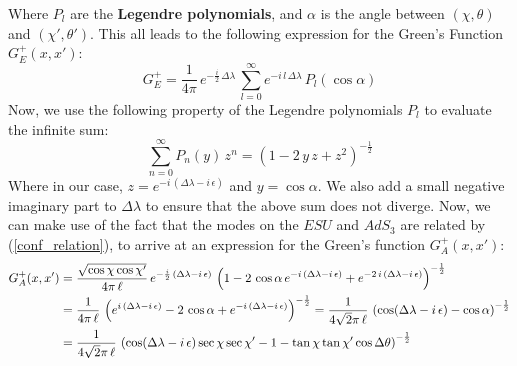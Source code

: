 %
%
%
%
%
%
Where $P_l$ are the \textbf{Legendre polynomials}, and $\alpha$ is the angle between $(\chi, \theta)$ and $(\chi', \theta')$. This all leads to the following expression for the Green's Function $G_E^+(x, x')$:
%
%
\begin{equation}
%
%
G_E^+ = \frac{1}{4 \pi} \,
e^{-\frac{i}{2} \, \Delta \lambda} \, \sum_{l = 0}^\infty
e^{-i \, l \, \Delta \lambda} \, P_l(\cos \alpha)
\end{equation}
%
%
Now, we use the following property of the Legendre polynomials $P_l$ to evaluate the infinite sum: 
%
%
\begin{equation}
\sum_{n=0}^\infty P_n(y) \, z^n = (1 - 2 \, y \, z + z^2)^{-\frac{1}{2}}
\end{equation}
%
%
Where in our case, $z = e^{- i \, (\Delta \lambda - i \, \epsilon)}$ and $y = \cos \alpha$. We also add a small negative imaginary part to $\Delta \lambda$ to ensure that the above sum does not diverge. Now, we can make use of the fact that the modes on the $ESU$ and $AdS_3$ are related by (\ref{conf_relation}), to arrive at an expression for the Green's function $G_A^+(x,x')$:
%
\newpage
%
%
\begin{align}
G_A^+(x, x') & = \frac{\sqrt{\cos \chi  \cos \chi'}}{4 \pi \, \ell} \, 
e^{-\frac{i}{2} \, (\Delta \lambda - i \, \epsilon)} \,
\left(
1 - 2 \, \cos \alpha  \, e^{- i \, (\Delta \lambda - i \, \epsilon)} + e^{- 2 \, i \, (\Delta \lambda - i \, \epsilon)}
\right)^{-\frac{1}{2}}
%
\notag\\
%
& = \frac{1}{4 \pi \, \ell} \,
\left(
e^{i \, (\Delta \lambda - i \, \epsilon)} - 2 \, \cos \alpha + e^{-i \, (\Delta \lambda - i \, \epsilon)}
\right)^{-\frac{1}{2}}
= \frac{1}{4 \sqrt{2} \pi \, \ell} \,
\left(
\cos (\Delta \lambda - i \, \epsilon) - \cos \alpha
\right)^{-\frac{1}{2}}
%
\notag\\
%
& = \frac{1}{4 \sqrt{2} \pi \, \ell} \,
\left(
\cos (\Delta \lambda - i \, \epsilon) \sec \chi  \sec \chi' - 1 - \tan \chi  \tan \chi'  \cos \Delta \theta
\right)^{-\frac{1}{2}}
\end{align}
